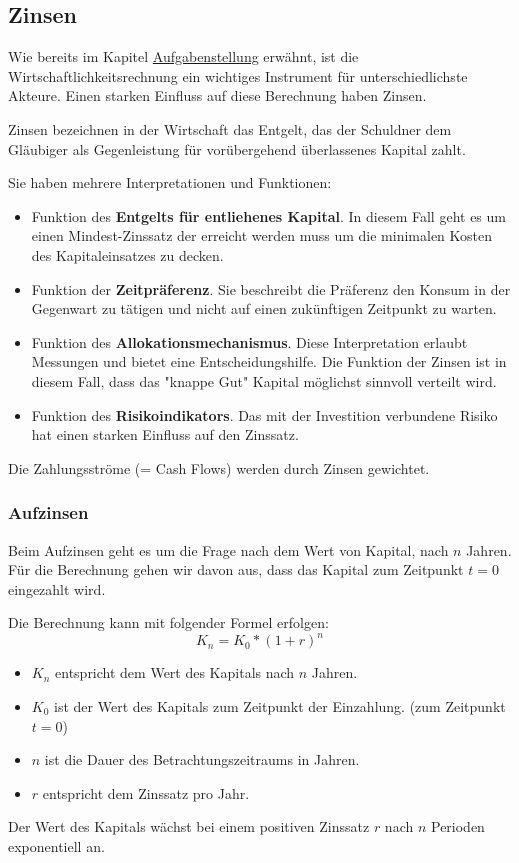 \documentclass[a4paper,12pt]{article}
\begin{document}
	\subsection{Zinsen}
	Wie bereits im Kapitel \hyperref[sec:Aufgabenstellung]{Aufgabenstellung} erwähnt, ist die Wirtschaftlichkeitsrechnung ein wichtiges Instrument für unterschiedlichste Akteure.\newline
	Einen starken Einfluss auf diese Berechnung haben Zinsen.\\ \par
	\noindent Zinsen bezeichnen in der Wirtschaft das Entgelt, das der Schuldner dem Gläubiger als Gegenleistung für vorübergehend überlassenes Kapital zahlt.\\ \par
	\noindent Sie haben mehrere Interpretationen und Funktionen:
	\begin{itemize}
		\item Funktion des \textbf{Entgelts für entliehenes Kapital}. In diesem Fall geht es um einen Mindest-Zinssatz der erreicht werden muss um die minimalen Kosten des Kapitaleinsatzes zu decken.
		\item Funktion der \textbf{Zeitpräferenz}. Sie beschreibt die Präferenz den Konsum in der Gegenwart zu tätigen und nicht auf einen zukünftigen Zeitpunkt zu warten.
		\item Funktion des \textbf{Allokationsmechanismus}. Diese Interpretation erlaubt Messungen und bietet eine Entscheidungshilfe. Die Funktion der Zinsen ist in diesem Fall, dass das "knappe Gut" Kapital möglichst sinnvoll verteilt wird.
		\item Funktion des \textbf{Risikoindikators}. Das mit der Investition verbundene Risiko hat einen starken Einfluss auf den Zinssatz.
	\end{itemize}
	Die Zahlungsströme (= Cash Flows) werden durch Zinsen gewichtet.
	\subsubsection{Aufzinsen}
	Beim Aufzinsen geht es um die Frage nach dem Wert von Kapital, nach $n$ Jahren. Für die Berechnung gehen wir davon aus, dass das Kapital zum Zeitpunkt $t=0$ eingezahlt wird.\\ \par
	\noindent Die Berechnung kann mit folgender Formel erfolgen:
	\begin{equation}
	K_n=K_0*(1+r)^n
	\end{equation}
	\begin{itemize}
		\item $K_n$ entspricht dem Wert des Kapitals nach $n$ Jahren.
		\item $K_0$ ist der Wert des Kapitals zum Zeitpunkt der Einzahlung. (zum Zeitpunkt $t=0$)
		\item $n$ ist die Dauer des Betrachtungszeitraums in Jahren.
		\item $r$ entspricht dem Zinssatz pro Jahr.
	\end{itemize}
	Der Wert des Kapitals wächst bei einem positiven Zinssatz $r$ nach $n$ Perioden exponentiell an.
\end{document}
